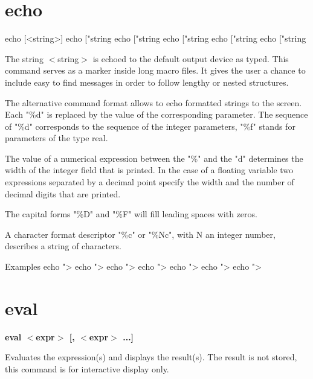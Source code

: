\section{echo}
\begin{MacVerbatim}
echo [<string>]
echo ["string%
echo ["string%
echo ["string%
echo ["string%
echo ["string%
\end{MacVerbatim}
The string $ <$string$> $ is echoed to the default output device as typed. 
This command serves as a marker inside long macro files. It gives the 
user a chance to include easy to find messages in order to follow 
lengthy or nested structures. 
\par
The alternative command format allows to echo formatted strings to the 
screen. Each "\%d" is replaced by the value of the corresponding 
parameter. The sequence of "\%d" corresponds to the sequence of the 
integer parameters, "\%f" stands for parameters of the type real. 
\par
The value of a numerical expression between the "\%" and the "d" 
determines the width of the integer field that is printed. 
In the case of a floating variable two expressions separated by 
a decimal point specify the width and the number of decimal 
digits that are printed. 
\par
The capital forms "\%D" and "\%F" will fill leading spaces with zeros. 
\par
A character format descriptor "\%c" or "\%Nc", with N an integer 
number, describes a string of characters. 
\par
\begin{MacVerbatim}
Examples
echo ">%
echo ">%
echo ">%
echo ">%
echo ">%
echo ">%
echo ">%
\end{MacVerbatim}
\section{eval}
{\bf eval $ <$expr$> $ [, $ <$expr$> $ ...] \par }
\par
\vspace{3pt}
Evaluates the expression(s) and displays the result(s). The result is not 
stored, this command is for interactive display only. 
